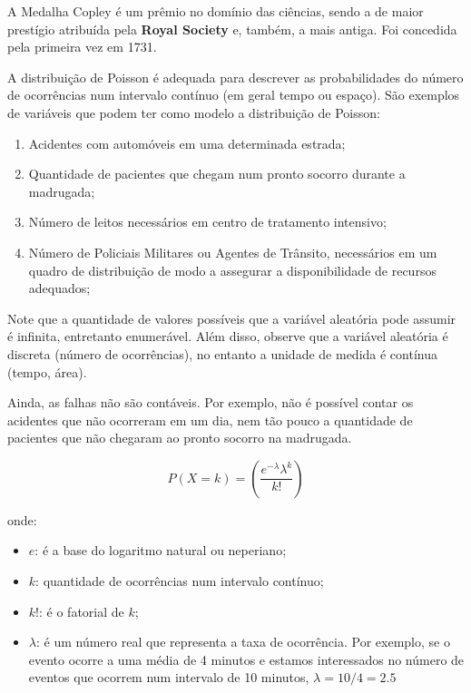 A Medalha Copley é um prêmio no domínio das ciências, sendo
a de maior prestígio atribuída pela \textbf{Royal Society} e, também, a mais antiga. Foi concedida pela primeira vez em 1731.\vskip0.3cm


  
\inic A distribuição de Poisson é adequada para descrever as probabilidades do número de ocorrências num intervalo contínuo (em geral tempo ou espaço). São exemplos de variáveis que podem ter como modelo a distribuição de Poisson:

\begin{enumerate}
    \item Acidentes com automóveis em uma determinada estrada;
    \item Quantidade de pacientes que chegam num pronto socorro durante a madrugada;
    \item  Número de leitos necessários em centro de tratamento intensivo;
    \item  Número de Policiais Militares ou Agentes de Trânsito, necessários em um quadro de distribuição de modo a assegurar a disponibilidade de recursos adequados;
\end{enumerate}



\inic Note que a quantidade de valores possíveis que a variável aleatória pode assumir é infinita, entretanto enumerável. Além disso, observe que a variável aleatória é discreta (número de ocorrências), no entanto a unidade de medida é contínua (tempo, área).\vskip0.3cm

Ainda, as falhas não são contáveis. Por exemplo, não é possível contar os acidentes que não ocorreram em um dia, nem tão pouco a quantidade de pacientes que não chegaram ao pronto socorro na madrugada.
 
 
\begin{equation}
    P\left(X=k\right)= \left( \frac{e^{-\lambda}\lambda^{k}}{k!} \right)
\end{equation}

onde:

\begin{itemize}
\item $e$: é a base do logaritmo natural ou neperiano;
\item $k$: quantidade de ocorrências num intervalo contínuo;
\item $k!$: é o fatorial de $k$; 
\item $\lambda$: é um número real que representa a taxa de ocorrência. Por exemplo, se o evento ocorre a uma média de 4 minutos e estamos interessados no número de eventos que ocorrem num intervalo de 10 minutos, $\lambda={10}/{4}=2.5$
\end{itemize}

